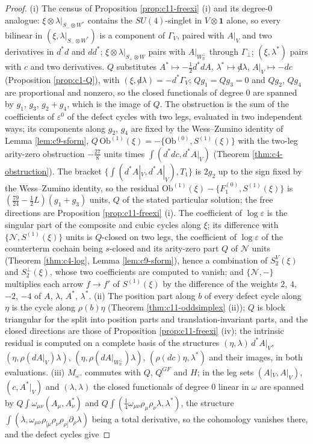 \begin{proof}
(i) The census of Proposition \ref{prop:c11-freexi} (i) and its degree-$0$ analogue: $\xi\otimes\lambda|_{S_-\otimes W^*}$ contains the $SU(4)$-singlet in $V\otimes\mathbf1$ alone, so every bilinear in $(\xi,\lambda|_{S_-\otimes W^*})$ is a component of $\Gamma_V$, paired with $A|_V$ and two derivatives in $d^*d$ and $dd^*$; $\xi\otimes\lambda|_{S_+\otimes W}$ pairs with $A|_{W_{\mathbb R}^\perp}$ through $\Gamma_\perp$; $(\xi,\lambda^*)$ pairs with $c$ and two derivatives. $Q$ substitutes $A^*\mapsto-\tfrac12d^*dA$, $\lambda^*\mapsto{\not d}\lambda$, $A|_V\mapsto-dc$ (Proposition \ref{prop:c1-Q}), with $(\xi,{\not d}\lambda)=-d^*\Gamma_V$; $Qg_1=Qg_3=0$ and $Qg_2$, $Qg_4$ are proportional and nonzero, so the closed functionals of degree $0$ are spanned by $g_1$, $g_3$, $g_2+g_4$, which is the image of $Q$. The obstruction is the sum of the coefficients of $\varepsilon^0$ of the defect cycles with two legs, evaluated in two independent ways; its components along $g_2$, $g_4$ are fixed by the Wess--Zumino identity of Lemma \ref{lem:c9-sform}, $Q\,\mathrm{Ob}^{(1)}(\xi)=-\{\mathrm{Ob}^{(0)},S^{(1)}(\xi)\}$ with the two-leg arity-zero obstruction $-\tfrac{27}8$ units times $\int(d^*dc,d^*A|_V)$ (Theorem \ref{thm:c4-obstruction}). The bracket $\{\int(d^*A|_V,d^*A|_V),T_1\}$ is $2g_2$ up to the sign fixed by the Wess--Zumino identity, so the residual $\mathrm{Ob}^{(1)}(\xi)-\{F_1^{(0)},S^{(1)}(\xi)\}$ is $(\tfrac{79}{24}-\tfrac12L)(g_1+g_3)$ units, $Q$ of the stated particular solution; the free directions are Proposition \ref{prop:c11-freexi} (i). The coefficient of $\log\varepsilon$ is the singular part of the composite and cubic cycles along $\xi$; its difference with $\{\mathcal N,S^{(1)}(\xi)\}$ units is $Q$-closed on two legs, the coefficient of $\log\varepsilon$ of the counterterm cochain being $s$-closed and its arity-zero part $Q$ of $\mathcal N$ units (Theorem \ref{thm:c4-log}, Lemma \ref{lem:c9-sform}), hence a combination of $S^V_2(\xi)$ and $S^\perp_2(\xi)$, whose two coefficients are computed to vanish; and $\{\mathcal N,-\}$ multiplies each arrow $f\to f'$ of $S^{(1)}(\xi)$ by the difference of the weights $2$, $4$, $-2$, $-4$ of $A$, $\lambda$, $A^*$, $\lambda^*$. (ii) The position part along $b$ of every defect cycle along $\eta$ is the cycle along $\rho(b)\eta$ (Theorem \ref{thm:c11-oddsimplex} (ii)); $Q$ is block triangular for the split into position parts and translation-invariant parts, and the closed directions are those of Proposition \ref{prop:c11-freexi} (iv); the intrinsic residual is computed on a complete basis of the structures $(\eta,\lambda)\,d^*A|_V$, $(\eta,\rho(dA|_V)\lambda)$, $(\eta,\rho(dA|_{W_{\mathbb R}^\perp})\lambda)$, $(\rho(dc)\eta,\lambda^*)$ and their images, in both evaluations. (iii) $M_\omega.$ commutes with $Q$, $Q^{GF}$ and $H$; in the leg sets $(A|_V,A|_V)$, $(c,A^*|_V)$ and $(\lambda,\lambda)$ the closed functionals of degree $0$ linear in $\omega$ are spanned by $Q\int\omega_{\mu\nu}(A_\mu,A^*_\nu)$ and $Q\int(\tfrac14\omega_{\mu\nu}\rho_\mu\rho_\nu\lambda,\lambda^*)$, the structure $\int(\lambda,\omega_{\mu\nu}\rho_{[\mu}\rho_\nu\rho_{\rho]}\partial_\rho\lambda)$ being a total derivative, so the cohomology vanishes there, and the defect cycles give 
\end{proof}
